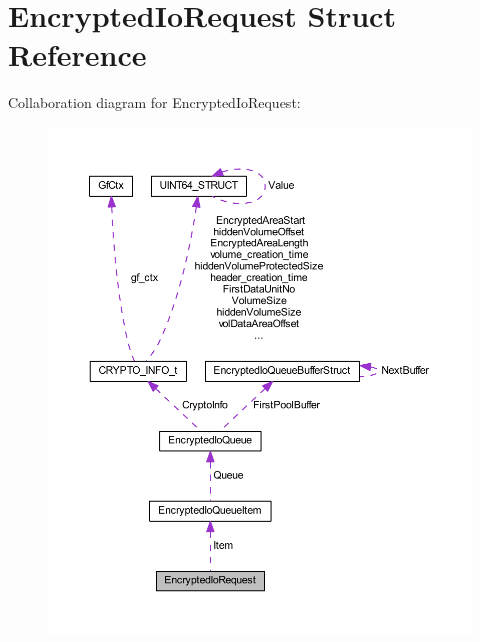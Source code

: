 \hypertarget{struct_encrypted_io_request}{}\section{Encrypted\+Io\+Request Struct Reference}
\label{struct_encrypted_io_request}


Collaboration diagram for Encrypted\+Io\+Request\+:
\nopagebreak
\begin{figure}[H]
\begin{center}
\leavevmode
\includegraphics[width=350pt]{struct_encrypted_io_request__coll__graph}
\end{center}
\end{figure}
